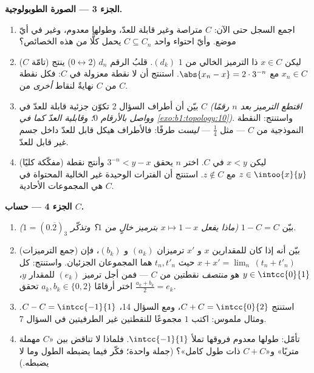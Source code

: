 \begin{problem}[{مسألة نهاية الأسبوع --- \omterm{pb:b1:topology:1}{مجموعة كانتور} ذات الأثلاث
الوسطى: طولها معدوم، وغير قابلة للعدّ، وتامّة، و $C + C =
\intcc{0}{2}$}]
\medskip
\noindent\textbf{الجزء 3 --- الصورة الطوبولوجية.}
\begin{enumerate}[resume]
  \item اجمع السجل حتى الآن: $C$ متراصة وغير قابلة للعدّ،
        وطولها معدوم، وغير  في أيّ موضع. وأيّ احتواء واحد
        $C \subseteq C_n$ يحمل كلًّا من هذه الخصائص؟
  \item ($C$ تامّة) ليكن $x \in C$ ذا الترميز الخالي من $1$
        $(d_k)$. قلبُ الرقم $d_n$ ($0 \leftrightarrow
        2$) ينتج $x_n \in C$ مع $\abs{x_n - x} = 2 \cdot
        3^{-n}$. استنتج أن لا نقطة معزولة في $C$: فكل
        نقطة من $C$ نهايةٌ لنقاط \emph{أخرى} من $C$.
  \item بيّن أن أطراف السؤال 2 تكوّن  جزئية قابلة للعدّ
         في $C$ \emph{(اقتطع الترميز بعد $n$
        رقمًا وواصل بالأرقام $0$؛ وقابلية العدّ كما في
        \cref{exo:b1:topology:10})}. واستنتج: النقطة النموذجية
        من $C$ --- مثل $\frac14$ --- \emph{ليست} طرفًا:
        فالأطراف هيكل قابل للعدّ داخل جسم غير قابل
        للعدّ.
  \item (مفكّكة كليًا) ليكن $x < y$ في $C$. اختر $n$
        يحقق $3^{-n} < y - x$ وأنتج نقطة $z \in
        \intoo{x}{y}$ مع $z \notin C$. استنتج أن الفترات
        الوحيدة غير الخالية المحتواة في $C$ هي المجموعات الأحادية.
\end{enumerate}

\medskip
\noindent\textbf{الجزء 4 --- حساب $C$.}
\begin{enumerate}[resume]
  \item بيّن $1 - C = C$ \emph{(ماذا يفعل $x \mapsto 1 - x$
        بترميز خالٍ من $1$؟ وتذكّر $1 = (0.\overline{2})_3$)}.
  \item (جمع الترميزات) بيّن أنه إذا كان للمقدارين $x$ و $x'$ ترميزان
        $(a_k)$ و $(b_k)$، فإن $x + x' = \lim_n\,(t_n + t'_n)$
        حيث $t_n, t'_n$ هما المجموعان الجزئيان. واستنتج: كل $y
        \in \intcc{0}{1}$ هو \emph{منتصف} نقطتين
        من $C$ --- فمن أجل ترميز $(e_k)$ للمقدار $y$، اختر أرقامًا
        $a_k, b_k \in \{0, 2\}$ تحقق $\frac{a_k + b_k}{2} =
        e_k$.
  \item استنتج $C + C = \intcc{0}{2}$، ومع السؤال 14،
        $C - C = \intcc{-1}{1}$. ومثال ملموس: اكتب $1$
        مجموعًا للنقطتين غير الطرفيتين في السؤال 7.
  \item تأمّل:  طولها معدوم  فروقها تملأ
        $\intcc{-1}{1}$. فلماذا لا تناقض بين
        «$C$ مهملة متريًا» و«$C + C$ ذات طول
        كامل»؟ (جملة واحدة؛ فكّر فيما يضبطه الطول
        وما لا يضبطه.)
\end{enumerate}


\end{problem}
